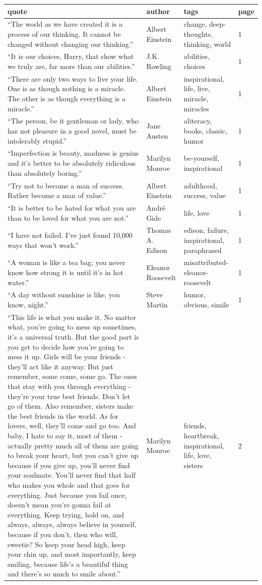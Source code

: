 \documentclass[
  letterpaper,
  DIV=11,
  numbers=noendperiod]{scrreprt}
\begin{document}
\begin{tabular}[t]{l|l|l|l}
\hline
quote & author & tags & page\\
\hline
“The world as we have created it is a process of our thinking. It cannot be changed without changing our thinking.” & Albert Einstein & change, deep-thoughts, thinking, world & 1\\
\hline
“It is our choices, Harry, that show what we truly are, far more than our abilities.” & J.K. Rowling & abilities, choices & 1\\
\hline
“There are only two ways to live your life. One is as though nothing is a miracle. The other is as though everything is a miracle.” & Albert Einstein & inspirational, life, live, miracle, miracles & 1\\
\hline
“The person, be it gentleman or lady, who has not pleasure in a good novel, must be intolerably stupid.” & Jane Austen & aliteracy, books, classic, humor & 1\\
\hline
“Imperfection is beauty, madness is genius and it's better to be absolutely ridiculous than absolutely boring.” & Marilyn Monroe & be-yourself, inspirational & 1\\
\hline
“Try not to become a man of success. Rather become a man of value.” & Albert Einstein & adulthood, success, value & 1\\
\hline
“It is better to be hated for what you are than to be loved for what you are not.” & André Gide & life, love & 1\\
\hline
“I have not failed. I've just found 10,000 ways that won't work.” & Thomas A. Edison & edison, failure, inspirational, paraphrased & 1\\
\hline
“A woman is like a tea bag; you never know how strong it is until it's in hot water.” & Eleanor Roosevelt & misattributed-eleanor-roosevelt & 1\\
\hline
“A day without sunshine is like, you know, night.” & Steve Martin & humor, obvious, simile & 1\\
\hline
“This life is what you make it. No matter what, you're going to mess up sometimes, it's a universal truth. But the good part is you get to decide how you're going to mess it up. Girls will be your friends - they'll act like it anyway. But just remember, some come, some go. The ones that stay with you through everything - they're your true best friends. Don't let go of them. Also remember, sisters make the best friends in the world. As for lovers, well, they'll come and go too. And baby, I hate to say it, most of them - actually pretty much all of them are going to break your heart, but you can't give up because if you give up, you'll never find your soulmate. You'll never find that half who makes you whole and that goes for everything. Just because you fail once, doesn't mean you're gonna fail at everything. Keep trying, hold on, and always, always, always believe in yourself, because if you don't, then who will, sweetie? So keep your head high, keep your chin up, and most importantly, keep smiling, because life's a beautiful thing and there's so much to smile about.” & Marilyn Monroe & friends, heartbreak, inspirational, life, love, sisters & 2\\

\end{tabular}
\end{document}
